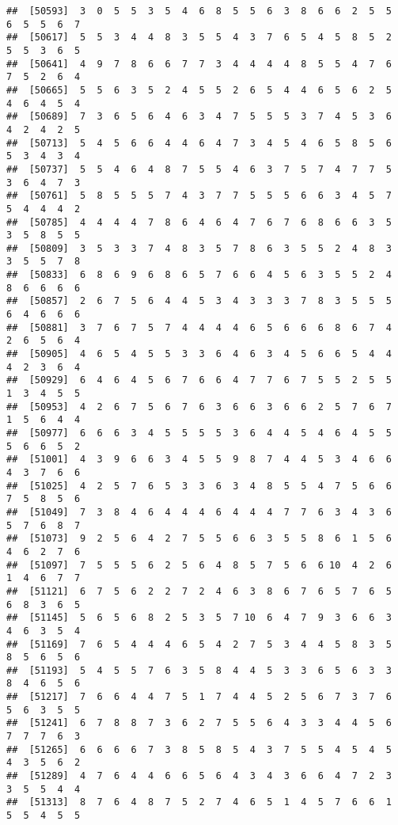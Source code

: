 \documentclass[
]{book}
\begin{document}
\begin{verbatim}
##  [50593]  3  0  5  5  3  5  4  6  8  5  5  6  3  8  6  6  2  5  5  6  5  5  6  7
##  [50617]  5  5  3  4  4  8  3  5  5  4  3  7  6  5  4  5  8  5  2  5  5  3  6  5
##  [50641]  4  9  7  8  6  6  7  7  3  4  4  4  4  8  5  5  4  7  6  7  5  2  6  4
##  [50665]  5  5  6  3  5  2  4  5  5  2  6  5  4  4  6  5  6  2  5  4  6  4  5  4
##  [50689]  7  3  6  5  6  4  6  3  4  7  5  5  5  3  7  4  5  3  6  4  2  4  2  5
##  [50713]  5  4  5  6  6  4  4  6  4  7  3  4  5  4  6  5  8  5  6  5  3  4  3  4
##  [50737]  5  5  4  6  4  8  7  5  5  4  6  3  7  5  7  4  7  7  5  3  6  4  7  3
##  [50761]  5  8  5  5  5  7  4  3  7  7  5  5  5  6  6  3  4  5  7  5  4  4  4  2
##  [50785]  4  4  4  4  7  8  6  4  6  4  7  6  7  6  8  6  6  3  5  3  5  8  5  5
##  [50809]  3  5  3  3  7  4  8  3  5  7  8  6  3  5  5  2  4  8  3  3  5  5  7  8
##  [50833]  6  8  6  9  6  8  6  5  7  6  6  4  5  6  3  5  5  2  4  8  6  6  6  6
##  [50857]  2  6  7  5  6  4  4  5  3  4  3  3  3  7  8  3  5  5  5  6  4  6  6  6
##  [50881]  3  7  6  7  5  7  4  4  4  4  6  5  6  6  6  8  6  7  4  2  6  5  6  4
##  [50905]  4  6  5  4  5  5  3  3  6  4  6  3  4  5  6  6  5  4  4  4  2  3  6  4
##  [50929]  6  4  6  4  5  6  7  6  6  4  7  7  6  7  5  5  2  5  5  1  3  4  5  5
##  [50953]  4  2  6  7  5  6  7  6  3  6  6  3  6  6  2  5  7  6  7  1  5  6  4  4
##  [50977]  6  6  6  3  4  5  5  5  5  3  6  4  4  5  4  6  4  5  5  5  6  6  5  2
##  [51001]  4  3  9  6  6  3  4  5  5  9  8  7  4  4  5  3  4  6  6  4  3  7  6  6
##  [51025]  4  2  5  7  6  5  3  3  6  3  4  8  5  5  4  7  5  6  6  7  5  8  5  6
##  [51049]  7  3  8  4  6  4  4  4  6  4  4  4  7  7  6  3  4  3  6  5  7  6  8  7
##  [51073]  9  2  5  6  4  2  7  5  5  6  6  3  5  5  8  6  1  5  6  4  6  2  7  6
##  [51097]  7  5  5  5  6  2  5  6  4  8  5  7  5  6  6 10  4  2  6  1  4  6  7  7
##  [51121]  6  7  5  6  2  2  7  2  4  6  3  8  6  7  6  5  7  6  5  6  8  3  6  5
##  [51145]  5  6  5  6  8  2  5  3  5  7 10  6  4  7  9  3  6  6  3  4  6  3  5  4
##  [51169]  7  6  5  4  4  4  6  5  4  2  7  5  3  4  4  5  8  3  5  8  5  6  5  6
##  [51193]  5  4  5  5  7  6  3  5  8  4  4  5  3  3  6  5  6  3  3  8  4  6  5  6
##  [51217]  7  6  6  4  4  7  5  1  7  4  4  5  2  5  6  7  3  7  6  5  6  3  5  5
##  [51241]  6  7  8  8  7  3  6  2  7  5  5  6  4  3  3  4  4  5  6  7  7  7  6  3
##  [51265]  6  6  6  6  7  3  8  5  8  5  4  3  7  5  5  4  5  4  5  4  3  5  6  2
##  [51289]  4  7  6  4  4  6  6  5  6  4  3  4  3  6  6  4  7  2  3  3  5  5  4  4
##  [51313]  8  7  6  4  8  7  5  2  7  4  6  5  1  4  5  7  6  6  1  5  5  4  5  5

\end{verbatim}
\end{document}
